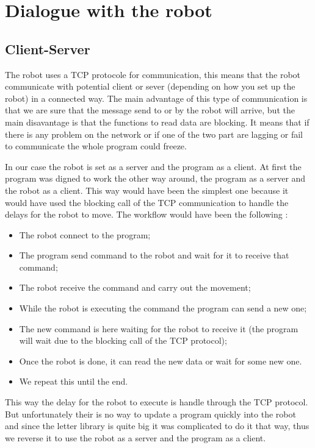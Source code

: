 \section{Dialogue with the robot}

\subsection{Client-Server}

The robot uses a TCP protocole for communication, this means that the robot communicate with potential client or sever (depending on how you set up the robot) in a connected way. The main advantage of this type of communication is that we are sure that the message send to or by the robot will arrive, but the main disavantage is that the functions to read data are blocking. It means that if there is any problem on the network or if one of the two part are lagging or fail to communicate the whole program could freeze.

In our case the robot is set as a server and the program as a client. At first the program was digned to work the other way around, the program as a server and the robot as a client. This way would have been the simplest one because it would have used the blocking call of the TCP communication to handle the delays for the robot to move.
The workflow would have been the following :
\begin{itemize}
    \item The robot connect to the program;
    \item The program send command to the robot and wait for it to receive that command;
    \item The robot receive the command and carry out the movement;
    \item While the robot is executing the command the program can send a new one;
    \item The new command is here waiting for the robot to receive it (the program will wait due to the blocking call of the TCP protocol);
    \item Once the robot is done, it can read the new data or wait for some new one.
    \item We repeat this until the end.
\end{itemize}

This way the delay for the robot to execute is handle through the TCP protocol. But unfortunately their is no way to update a program quickly into the robot and since the letter library is quite big it was complicated to do it that way, thus we reverse it to use the robot as a server and the program as a client.

